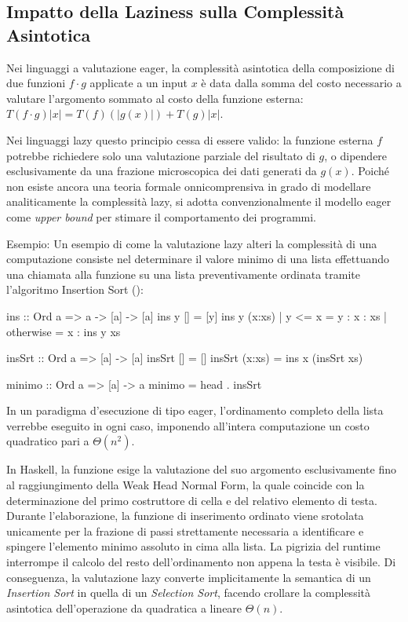 \subsection{Impatto della Laziness sulla Complessità Asintotica}
Nei linguaggi a valutazione eager, la complessità asintotica della composizione di due funzioni $f \cdot g$ applicate a un input $x$ è data dalla somma del costo necessario a valutare l'argomento sommato al costo della funzione esterna: $T(f \cdot g) |x| = T(f) (|g(x)|) + T(g)|x|$.

Nei linguaggi lazy questo principio cessa di essere valido: la funzione esterna $f$ potrebbe richiedere solo una valutazione parziale del risultato di $g$, o dipendere esclusivamente da una frazione microscopica dei dati generati da $g(x)$. Poiché non esiste ancora una teoria formale onnicomprensiva in grado di modellare analiticamente la complessità lazy, si adotta convenzionalmente il modello eager come \textit{upper bound} per stimare il comportamento dei programmi.

\begin{gframe}{Esempio: }
Un esempio di come la valutazione lazy alteri la complessità di una computazione consiste nel determinare il valore minimo di una lista effettuando una chiamata alla funzione  su una lista preventivamente ordinata tramite l'algoritmo Insertion Sort ():

\begin{haskellbox}{}
ins :: Ord a => a -> [a] -> [a]
ins y [] = [y]
ins y (x:xs)
  | y <= x    = y : x : xs
  | otherwise = x : ins y xs

insSrt :: Ord a => [a] -> [a]
insSrt []     = []
insSrt (x:xs) = ins x (insSrt xs)

minimo :: Ord a => [a] -> a
minimo = head . insSrt
\end{haskellbox}

In un paradigma d'esecuzione di tipo eager, l'ordinamento completo della lista verrebbe eseguito in ogni caso, imponendo all'intera computazione un costo quadratico pari a $\Theta(n^2)$. 

In Haskell, la funzione  esige la valutazione del suo argomento esclusivamente fino al raggiungimento della Weak Head Normal Form, la quale coincide con la determinazione del primo costruttore di cella \code{:} e del relativo elemento di testa. Durante l'elaborazione, la funzione di inserimento ordinato  viene srotolata unicamente per la frazione di passi strettamente necessaria a identificare e spingere l'elemento minimo assoluto in cima alla lista. La pigrizia del runtime interrompe il calcolo del resto dell'ordinamento non appena la testa è visibile. Di conseguenza, la valutazione lazy converte implicitamente la semantica di un \textit{Insertion Sort} in quella di un \textit{Selection Sort}, facendo crollare la complessità asintotica dell'operazione da quadratica a lineare $\Theta(n)$.
\end{gframe}

